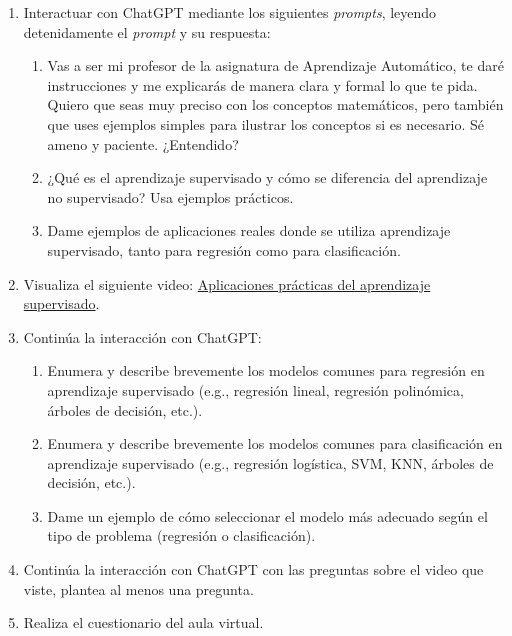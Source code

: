 \documentclass[a4,11pt]{aleph-notas}
\begin{document}
\begin{enumerate}[leftmargin=*]
    \item Interactuar con ChatGPT mediante los siguientes \textit{prompts}, leyendo detenidamente el \textit{prompt} y su respuesta:
    \begin{enumerate}[label=\textit{Prompt \arabic*.},leftmargin=2.1cm]
        \item Vas a ser mi profesor de la asignatura de Aprendizaje Automático, te daré instrucciones y me explicarás de manera clara y formal lo que te pida. Quiero que seas muy preciso con los conceptos matemáticos, pero también que uses ejemplos simples para ilustrar los conceptos si es necesario. Sé ameno y paciente. ¿Entendido?
        \item ¿Qué es el aprendizaje supervisado y cómo se diferencia del aprendizaje no supervisado? Usa ejemplos prácticos.
        \item Dame ejemplos de aplicaciones reales donde se utiliza aprendizaje supervisado, tanto para regresión como para clasificación.
    \end{enumerate}
    \item Visualiza el siguiente video: \href{https://youtu.be/Gx0LHgqyE_w}{Aplicaciones prácticas del aprendizaje supervisado}.
    \item Continúa la interacción con ChatGPT:
    \begin{enumerate}[label=\textit{Prompt \arabic*.},leftmargin=2.1cm, start=4]
        \item Enumera y describe brevemente los modelos comunes para regresión en aprendizaje supervisado (e.g., regresión lineal, regresión polinómica, árboles de decisión, etc.).
        \item Enumera y describe brevemente los modelos comunes para clasificación en aprendizaje supervisado (e.g., regresión logística, SVM, KNN, árboles de decisión, etc.).
        \item Dame un ejemplo de cómo seleccionar el modelo más adecuado según el tipo de problema (regresión o clasificación).
    \end{enumerate}
    \item Continúa la interacción con ChatGPT con las preguntas sobre el video que viste, plantea al menos una pregunta.
    \item Realiza el cuestionario del aula virtual.
\end{enumerate}
\end{document}
